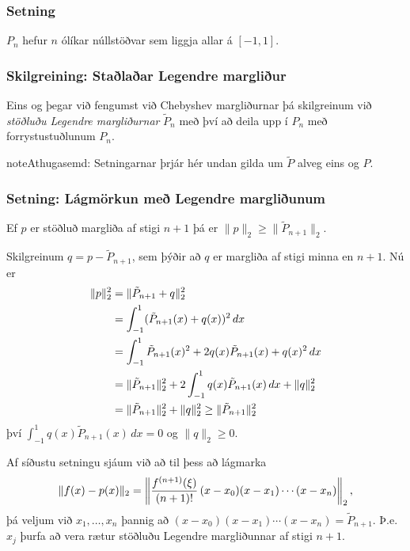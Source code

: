 \documentclass[a4paper,10pt,icelandic]{sphinxmanual}
\begin{document}
\subsubsection{Setning}
\label{kafli03:id6}
\(P_n\) hefur \(n\) ólíkar núllstöðvar sem liggja
allar á \([-1,1]\).


\subsubsection{Skilgreining: Staðlaðar Legendre margliður}
\label{kafli03:skilgreining-stalaar-legendre-margliur}
Eins og þegar við fengumst við Chebyshev margliðurnar þá skilgreinum við
\emph{stöðluðu Legendre margliðurnar} \(\tilde P_n\) með því að deila upp
í \(P_n\) með forrystustuðlunum \(P_n\).

\begin{notice}{note}{Athugasemd:}
Setningarnar þrjár hér undan gilda um \(\tilde P\) alveg eins og \(P\).
\end{notice}


\subsubsection{Setning: Lágmörkun með Legendre margliðunum}
\label{kafli03:setning-lagmorkun-me-legendre-margliunum}
Ef \(p\) er stöðluð margliða af stigi \(n+1\) þá er
\(\|p\|_2\geq \|\tilde P_{n+1}\|_2\).

Skilgreinum
\(q = p-\tilde P_{n+1}\), sem þýðir að \(q\) er margliða af
stigi minna en \(n+1\). Nú er
\begin{gather}
\begin{split}\begin{aligned}
   \|p\|_2^2 &= \|\tilde P_{n+1} + q\|_2^2 \\
   &= \int_{-1}^1 (\tilde P_{n+1}(x) + q(x))^2\, dx \\
   &= \int_{-1}^1 \tilde P_{n+1}(x)^2 + 2q(x)\tilde P_{n+1}(x) + q(x)^2\, dx\\
   &= \|\tilde P_{n+1}\|_2^2 + 2\int_{-1}^1 q(x)\tilde P_{n+1}(x)\, dx + \|q\|_2^2\\
   &= \|\tilde P_{n+1}\|_2^2 +  \|q\|_2^2 \geq \|\tilde P_{n+1}\|_2^2
  \end{aligned}\end{split}\notag
\end{gather}
því \(\int_{-1}^1 q(x)\tilde P_{n+1}(x)\, dx=0\) og
\(\|q\|_2 \geq 0\).

Af síðustu setningu sjáum við að til þess að lágmarka
\begin{gather}
\begin{split}\|f(x)-p(x)\|_2 = \left\|\frac{f^{(n+1)}(\xi)}{(n+1)!}\, (x-x_0)(x-x_1)\cdots (x-x_n) \right\|_2,\end{split}\notag
\end{gather}
þá veljum við \(x_1,\ldots,x_n\) þannig að
\((x-x_0)(x-x_1)\cdots (x-x_n) = \tilde P_{n+1}\).
Þ.e. \(x_j\) þurfa að vera rætur stöðluðu Legendre margliðunnar af
stigi \(n+1\).
\end{document}
